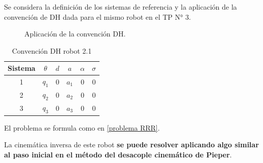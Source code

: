 \documentclass[a4paper,12pt]{article}
\begin{document}
Se considera la definición de los sistemas de referencia y la aplicación de la convención de DH dada para el mismo robot en el TP N° 3.

\begin{figure}[H]
    \centering
    \begin{adjustbox}{scale = 0.58, max width=\columnwidth}
    \end{adjustbox}
    \caption{Aplicación de la convención DH.}
\end{figure}

\begin{table}[H]
    \centering
    \begin{tabular}{|c|c|c|c|c|c|}
    \hline
    Sistema & $\theta$ & $d$ & $a$         & $\alpha$ & $\sigma$ \\ \hline
    1       & $q_1$     & 0   & $a_{1}$  & 0        & 0        \\ \hline
    2       & $q_2$     & 0   & $a_{2}$  & 0        & 0        \\ \hline
    3       & $q_3$     & 0   & $a_{3}$  & 0        & 0        \\ \hline
    \end{tabular}
    \caption{Convención DH robot 2.1}
\end{table}

El problema se formula como en \cref{problema RRR}.

La cinemática inversa de este robot \textbf{se puede resolver aplicando algo similar al paso inicial en el método del desacople cinemático de Pieper}.
\end{document}
